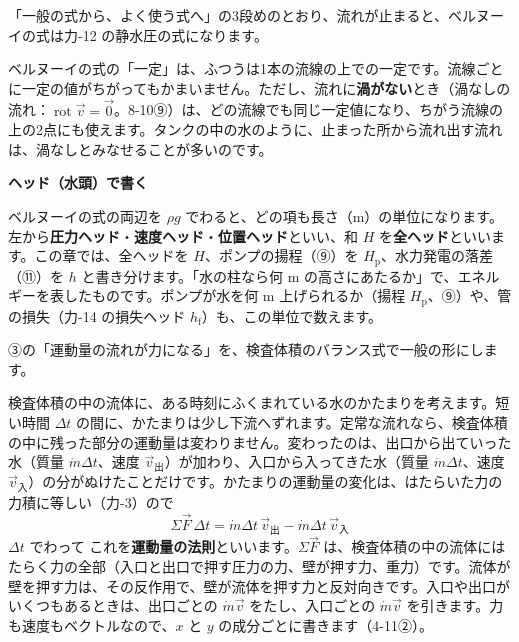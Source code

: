 \noindent 「一般の式から、よく使う式へ」の3段めのとおり、流れが止まると、ベルヌーイの式は力-12 の静水圧の式になります。

\begin{seikaku}
ベルヌーイの式の「一定」は、ふつうは1本の流線の上での一定です。流線ごとに一定の値がちがってもかまいません。ただし、流れに\textbf{渦がない}とき（渦なしの流れ：$\operatorname{rot}\vec v=\vec 0$。8-10⑨）は、どの流線でも同じ一定値になり、ちがう流線の上の2点にも使えます。タンクの中の水のように、止まった所から流れ出す流れは、渦なしとみなせることが多いのです。
\end{seikaku}

\noindent\textbf{ヘッド（水頭）で書く}\par\nobreak
ベルヌーイの式の両辺を $\rho g$ でわると、どの項も長さ（m）の単位になります。
左から\textbf{圧力ヘッド}・\textbf{速度ヘッド}・\textbf{位置ヘッド}といい、和 $H$ を\textbf{全ヘッド}といいます。この章では、全ヘッドを $H$、ポンプの揚程（⑨）を $H_{\mathrm p}$、水力発電の落差（⑪）を $h$ と書き分けます。「水の柱なら何 m の高さにあたるか」で、エネルギーを表したものです。ポンプが水を何 m 上げられるか（揚程 $H_{\mathrm p}$、⑨）や、管の損失（力-14 の損失ヘッド $h_{\mathrm{f}}$）も、この単位で数えます。




\leavevmode\label{ph:力-13:sec8}③の「運動量の流れが力になる」を、検査体積のバランス式で一般の形にします。

検査体積の中の流体に、ある時刻にふくまれている水のかたまりを考えます。短い時間 $\Delta t$ の間に、かたまりは少し下流へずれます。定常な流れなら、検査体積の中に残った部分の運動量は変わりません。変わったのは、出口から出ていった水（質量 $\dot m\Delta t$、速度 $\vec{v}_{\text{出}}$）が加わり、入口から入ってきた水（質量 $\dot m\Delta t$、速度 $\vec{v}_{\text{入}}$）の分がぬけたことだけです。かたまりの運動量の変化は、はたらいた力の力積に等しい（力-3）ので
\[ \Sigma\vec{F}\,\Delta t=\dot m\Delta t\,\vec{v}_{\text{出}}-\dot m\Delta t\,\vec{v}_{\text{入}} \]
$\Delta t$ でわって
\label{ph:力-13:undouryou}これを\textbf{運動量の法則}といいます。$\Sigma\vec{F}$ は、検査体積の中の流体にはたらく力の全部（入口と出口で押す圧力の力、壁が押す力、重力）です。流体が壁を押す力は、その反作用で、壁が流体を押す力と反対向きです。入口や出口がいくつもあるときは、出口ごとの $\dot m\vec{v}$ をたし、入口ごとの $\dot m\vec{v}$ を引きます。力も速度もベクトルなので、$x$ と $y$ の成分ごとに書きます（4-11②）。

